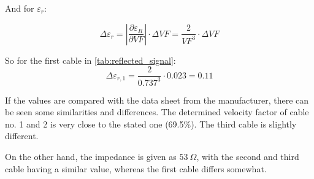         And for $ \varepsilon_r $:\par
        \begin{equation}
            \Delta \varepsilon_r = \left|\frac{\partial \varepsilon_R}{\partial VF}\right|\cdot \Delta VF = \frac{2}{VF^3} \cdot \Delta VF
        \end{equation}\par
        So for the first cable in \cref{tab:reflected_signal}:
        \begin{equation}
            \Delta \varepsilon_{r,1}=\frac{2}{0.737^3}\cdot 0.023=0.11
        \end{equation}\par
        If the values are compared with the data sheet from the manufacturer, there can be seen some similarities and differences.
        The determined velocity factor of cable no. 1 and 2 is very close to the stated one (69.5\%). The third cable is slightly
        different.\par
        On the other hand, the impedance is given as $ \SI{53}{\Omega} $, with the second and third cable having a similar value,
        whereas the first cable differs somewhat.
